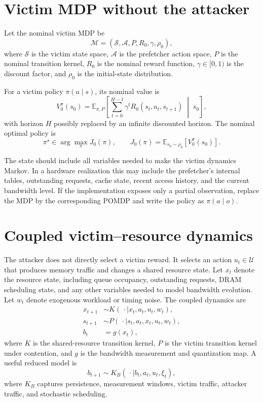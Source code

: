 \documentclass[11pt]{article}
\newcommand{\M}{\mathcal{M}}
\newcommand{\A}{\mathcal{A}}
\newcommand{\U}{\mathcal{U}}
\newcommand{\Sspace}{\mathcal{S}}
\newcommand{\Eexp}{\mathbb{E}}
\newcommand{\piopt}{\pi^{\star}}
\begin{document}
\section{Victim MDP without the attacker}

Let the nominal victim MDP be
\[
  \M = (\Sspace, \A, P, R_0, \gamma, \rho_0),
\]
where $\Sspace$ is the victim state space, $\A$ is the prefetcher action space, $P$ is the nominal transition kernel, $R_0$ is the nominal reward function, $\gamma \in [0,1)$ is the discount factor, and $\rho_0$ is the initial-state distribution.

For a victim policy $\pi(a \mid s)$, its nominal value is
\[
  V^{\pi}_0(s_0)
  = \Eexp_{\pi,P}\left[
      \sum_{t=0}^{H-1} \gamma^t R_0(s_t,a_t,s_{t+1})
      \;\middle|\;s_0
    \right],
\]
with horizon $H$ possibly replaced by an infinite discounted horizon. The nominal optimal policy is
\[
  \piopt \in \arg\max_{\pi} J_0(\pi),
  \qquad
  J_0(\pi) = \Eexp_{s_0\sim\rho_0}[V^{\pi}_0(s_0)].
\]

The state should include all variables needed to make the victim dynamics Markov. In a hardware realization this may include the prefetcher's internal tables, outstanding requests, cache state, recent access history, and the current bandwidth level. If the implementation exposes only a partial observation, replace the MDP by the corresponding POMDP and write the policy as $\pi(a\mid o)$.

\section{Coupled victim--resource dynamics}

The attacker does not directly select a victim reward. It selects an action $u_t \in \U$ that produces memory traffic and changes a shared resource state. Let $x_t$ denote the resource state, including queue occupancy, outstanding requests, DRAM scheduling state, and any other variables needed to model bandwidth evolution. Let $w_t$ denote exogenous workload or timing noise. The coupled dynamics are
\begin{align}
 x_{t+1} &\sim K(\,\cdot\mid x_t,a_t,u_t,w_t),\\
 s_{t+1} &\sim P(\,\cdot\mid s_t,a_t,x_t,u_t,w_t),\\
 b_t &= g(x_t),
\end{align}
where $K$ is the shared-resource transition kernel, $P$ is the victim transition kernel under contention, and $g$ is the bandwidth measurement and quantization map. A useful reduced model is
\[
 b_{t+1} \sim K_B(\,\cdot\mid b_t, a_t,u_t,\xi_t),
\]
where $K_B$ captures persistence, measurement windows, victim traffic, attacker traffic, and stochastic scheduling.
\end{document}
